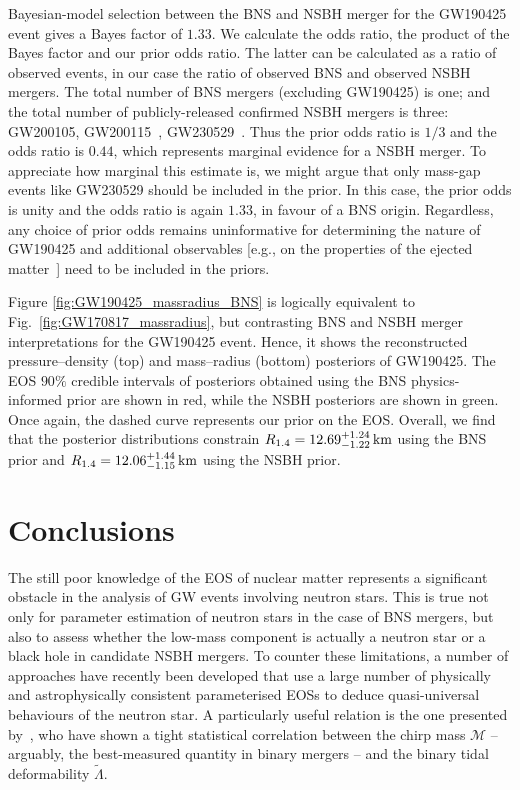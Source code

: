 \documentclass[twocolumn]{aastex631}
\begin{document}
Bayesian-model selection between the BNS and NSBH merger for the GW190425
event gives a Bayes factor of $1.33$.  We calculate the odds ratio, the
product of the Bayes factor and our prior odds ratio. The latter can be
calculated as a ratio of observed events, in our case the ratio of
observed BNS and observed NSBH mergers. The total number of BNS mergers
(excluding GW190425) is one; and the total number of publicly-released
confirmed NSBH mergers is three: GW200105, GW200115~\citep{GW200115},
GW230529~\citep{GW230529}. Thus the prior odds ratio is $1/3$ and the
odds ratio is $0.44$, which represents marginal evidence for a NSBH
merger. To appreciate how marginal this estimate is, we might argue that
only mass-gap events like GW230529 should be included in the prior. In
this case, the prior odds is unity and the odds ratio is again $1.33$, in
favour of a BNS origin. Regardless, any choice of prior odds remains
uninformative for determining the nature of GW190425 and additional
observables [e.g., on the properties of the ejected
  matter~\citep{Most:2021b}] need to be included in the priors.

Figure \ref{fig:GW190425_massradius_BNS} is logically equivalent to
Fig.~\ref{fig:GW170817_massradius}, but contrasting BNS and NSBH merger
interpretations for the GW190425 event. Hence, it shows the reconstructed
pressure--density (top) and mass--radius (bottom) posteriors of
GW190425. The EOS $90\%$ credible intervals of posteriors obtained using
the BNS physics-informed prior are shown in red, while the NSBH
posteriors are shown in green. Once again, the dashed curve represents
our prior on the EOS. Overall, we find that the posterior distributions
constrain $R_{1.4} = 12.69^{+1.24}_{-1.22} \, {\rm km}$ using the BNS
prior and $R_{1.4} = 12.06^{+1.44}_{-1.15} \, {\rm km}$ using the NSBH
prior.
	



\section{Conclusions}


The still poor knowledge of the EOS of nuclear matter represents a
significant obstacle in the analysis of GW events involving neutron
stars. This is true not only for parameter estimation of neutron stars in
the case of BNS mergers, but also to assess whether the low-mass
component is actually a neutron star or a black hole in candidate NSBH
mergers. To counter these limitations, a number of approaches have
recently been developed that use a large number of physically and
astrophysically consistent parameterised EOSs to deduce quasi-universal
behaviours of the neutron star. A particularly useful relation is the one
presented by~\cite{Altiparmak:2022}, who have shown a tight statistical
correlation between the chirp mass $\mathcal{M}$ -- arguably, the
best-measured quantity in binary mergers -- and the binary tidal
deformability $\tilde{\Lambda}$.
\end{document}
